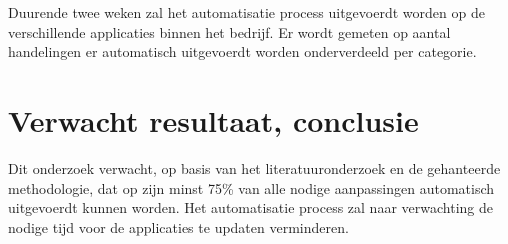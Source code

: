 Duurende twee weken zal het automatisatie process uitgevoerdt worden op de verschillende applicaties binnen het bedrijf.
Er wordt gemeten op aantal handelingen er automatisch uitgevoerdt worden onderverdeeld per categorie.

\section{Verwacht resultaat, conclusie}
\label{sec:verwachte_resultaten}

Dit onderzoek verwacht, op basis van het literatuuronderzoek en de gehanteerde methodologie, dat op zijn minst 75\% van alle nodige aanpassingen automatisch uitgevoerdt kunnen worden.
Het automatisatie process zal naar verwachting de nodige tijd voor de applicaties te updaten verminderen.


